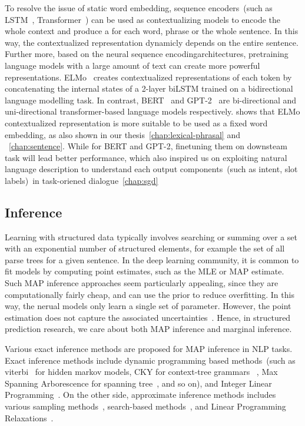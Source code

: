 To resolve the issue of static word embedding, sequence encoders~(such
as LSTM~\citep{hochreiter97lstm}, Transformer~\citep{NIPS2017_7181})
can be used as contextualizing models to encode the whole context and
produce a  for each word, phrase or
the whole sentence. In this way, the contextualized representation
dynamicly depends on the entire sentence.  Further more, based on the
neural sequence encodingarchitectures, pretraining language models
with a large amount of text can create more powerful representations.
ELMo~\cite{elmo} creates contextualized representations of each token
by concatenating the internal states of a 2-layer biLSTM trained on a
bidirectional language modelling task. In contrast,
BERT~\citep{devlin2019bert} and GPT-2~\citep{radford2018improving} are
bi-directional and uni-directional transformer-based language models
respectively. \citet{peters2019tune} shows that ELMo contextualized
representation is more suitable to be used as a fixed word embedding,
as also shown in our thesis~\autoref{chap:lexical-phrasal} and
~\autoref{chap:sentence}. While for BERT and GPT-2, finetuning them on
downsteam task will lead better performance, which also inspired us on
exploiting natural language description to understand each output
components~(such as intent, slot labels)~in task-oriened
dialogue~\autoref{chap:sgd}

\subsection{Inference}
\label{ssec:bg:inference}
Learning with structured data typically involves searching or summing
over a set with an exponential number of structured elements, for
example the set of all parse trees for a given sentence. In the deep
learning community, it is common to fit models by computing point
estimates, such as the MLE or MAP estimate. Such MAP inference
approaches seem particularly appealing, since they are computationally
fairly cheap, and can use the prior to reduce overfitting. In this
way, the nerual models only learn a single set of parameter. However,
the point estimation does not capture the associated
uncertainties~\citep{murphy2022probabilistic,wilson2020bayesian}.
Hence, in structured prediction research, we care about both MAP
inference and marginal inference.

 Various exact inference methods are proposed
for MAP inference in NLP tasks.  Exact inference methods include
dynamic programming based methods~(such as
viterbi~\citep{viterbi1967error} for hidden markov models, CKY for
context-tree
grammars~\cite{kasami1966efficient,younger1967recognition,cocke1969programming}
, Max Spanning Arborescence for spanning
tree~\cite{chu1965shortest,edmonds1967optimum}, and so on), and
Integer Linear
Programming~\citep{roth2005integer,roth2007global,berant2014modeling}. On
the other side, approximate inference methods includes various
sampling methods~\citep{finkel2005incorporating,singh2012monte},
search-based
methods~\citep{daume2009search,ross2011reduction,chang2015learning},
and Linear Programming
Relaxations~\citep{rush2012tutorial,werner2014power}.

